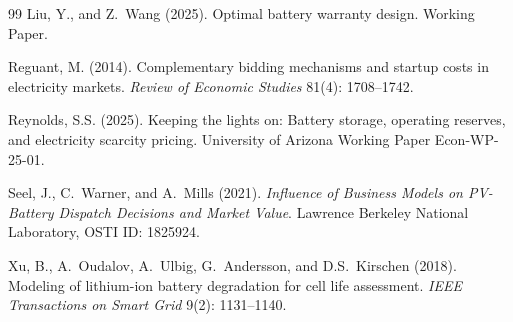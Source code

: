 \documentclass[12pt]{article}
\begin{document}
\begin{singlespace}
\begin{thebibliography}{99}
  Liu, Y., and Z.~Wang (2025).
  \newblock Optimal battery warranty design.
  \newblock Working Paper.

  Reguant, M. (2014).
  \newblock Complementary bidding mechanisms and startup costs in electricity
    markets.
  \newblock \textit{Review of Economic Studies} 81(4): 1708--1742.

  Reynolds, S.S. (2025).
  \newblock Keeping the lights on: Battery storage, operating reserves, and
    electricity scarcity pricing.
  \newblock University of Arizona Working Paper Econ-WP-25-01.

  Seel, J., C.~Warner, and A.~Mills (2021).
  \newblock \textit{Influence of Business Models on PV-Battery Dispatch Decisions
    and Market Value}.
  \newblock Lawrence Berkeley National Laboratory, OSTI ID: 1825924.

  Xu, B., A.~Oudalov, A.~Ulbig, G.~Andersson, and D.S.~Kirschen (2018).
  \newblock Modeling of lithium-ion battery degradation for cell life assessment.
  \newblock \textit{IEEE Transactions on Smart Grid} 9(2): 1131--1140.

\end{thebibliography}
\end{singlespace}
\end{document}
